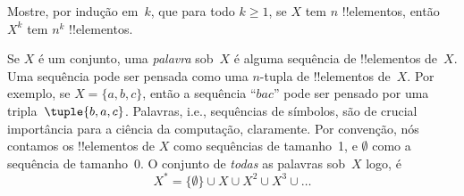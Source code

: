 \documentclass[../../../include/open-logic-section]{subfiles}
\begin{document}
\begin{prob}
Mostre, por indução em~$k$, que para todo $k \ge 1$, se $X$ tem $n$
!!{elemento}s, então $X^k$ tem $n^k$ !!{elemento}s.
\end{prob}


\begin{ex}
Se $X$ é um conjunto, uma \emph{palavra} sob~$X$ é alguma sequência de !!{elemento}s de~$X$. Uma sequência pode ser pensada como uma $n$-tupla de !!{elemento}s de~$X$. Por exemplo, se $X = \{a, b, c\}$, então a sequência ``$bac$'' pode ser pensado por uma tripla~$\tuple{b, a, c}$.
Palavras, i.e., sequências de símbolos, são de crucial importância para a ciência da computação, claramente. Por convenção, nós contamos os !!{elemento}s de $X$ como sequências de tamanho~1, e $\emptyset$ como a sequência de tamanho~0. O conjunto de \emph{todas} as palavras sob~$X$ logo, é
\[
X^* = \{\emptyset\} \cup X \cup X^2 \cup X^3 \cup \dots
\]
\end{ex}

\end{document}

